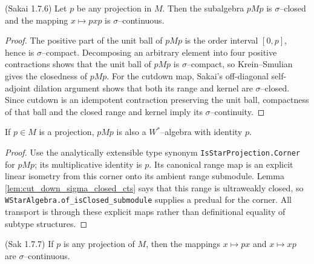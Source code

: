 \begin{lemma}
  \label{lem:cut_down_sigma_closed_cts} (Sakai 1.7.6)
  \leanok
  Let $p$ be any projection in $M$. Then the subalgebra $pMp$ is $\sigma$--closed and the mapping $x\mapsto pxp$ is $\sigma$--continuous.
\end{lemma}

\begin{proof}
  \leanok
  The positive part of the unit ball of $pMp$ is the order interval $[0,p]$, hence is
  $\sigma$--compact. Decomposing an arbitrary element into four positive contractions shows that
  the unit ball of $pMp$ is $\sigma$--compact, so Krein--Smulian gives the closedness of $pMp$.
  For the cutdown map, Sakai's off-diagonal self-adjoint dilation argument shows that both its range
  and kernel are $\sigma$--closed. Since cutdown is an idempotent contraction preserving the unit
  ball, compactness of that ball and the closed range and kernel imply its $\sigma$--continuity.
\end{proof}

\begin{lemma}
  \label{lem:cut_down_of_wstar}
  \leanok
  If $p\in M$ is a projection, $pMp$ is also a $W^{*}$--algebra with identity $p$.
\end{lemma}

\begin{proof}
  \leanok
  Use the analytically extensible type synonym \texttt{IsStarProjection.Corner} for $pMp$; its
  multiplicative identity is $p$. Its canonical range map is an explicit linear isometry from this
  corner onto its ambient range submodule. Lemma
  \ref{lem:cut_down_sigma_closed_cts} says that this range is ultraweakly closed, so
  \texttt{WStarAlgebra.of\_isClosed\_submodule} supplies a predual for the corner. All transport is
  through these explicit maps rather than definitional equality of subtype structures.
\end{proof}

\begin{lemma}
  \label{lem:left_mul_proj_right_mul_proj_sig_cts_Sak_1_7_7} (Sak 1.7.7)
  \leanok
  If $p$ is any projection of $M$, then the mappings $x\mapsto px$ and
  $x\mapsto xp$ are $\sigma$--continuous.
\end{lemma}

